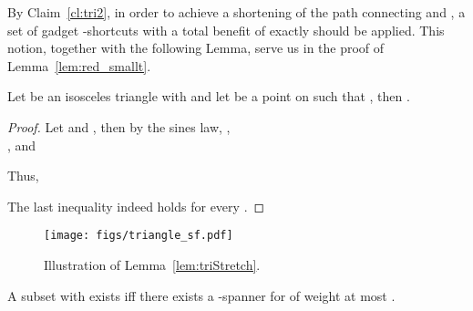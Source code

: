 \documentclass[a4paper]{llncs}
\begin{document}
By Claim~\ref{cl:tri2}, in order to achieve a  shortening 
of the path connecting  and ,
a set of gadget -shortcuts 
with a total benefit of exactly  should be applied.
This notion, together with the following Lemma, 
serve us in the proof of Lemma~\ref{lem:red_smallt}.



\begin{lemma}\label{lem:triStretch}
Let  be an isosceles triangle with  
and let  be a point on  such that ,
then .
\end{lemma}

\begin{proof}
Let  and ,
then by the sines law, , \\
, and

Thus, 


The last inequality indeed holds for every .
\end{proof}


\begin{figure}[htb]
    \centering
        \texttt{[image: figs/triangle\_sf.pdf]}
    \caption{Illustration of Lemma~\ref{lem:triStretch}.}
    \label{fig:triangle_sf}
\end{figure}




\begin{lemma}\label{lem:red_smallt}
A subset  with  exists 
iff there exists a -spanner for  of weight at most .
\end{lemma} 
\end{document}

